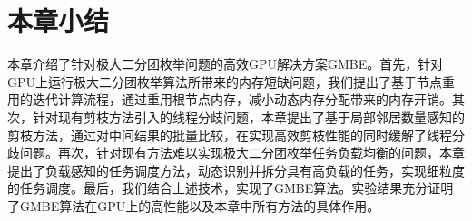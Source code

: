 \section{本章小结}

本章介绍了针对极大二分团枚举问题的高效GPU解决方案GMBE。首先，针对GPU上运行极大二分团枚举算法所带来的内存短缺问题，我们提出了基于节点重用的迭代计算流程，通过重用根节点内存，减小动态内存分配带来的内存开销。其次，针对现有剪枝方法引入的线程分歧问题，本章提出了基于局部邻居数量感知的剪枝方法，通过对中间结果的批量比较，在实现高效剪枝性能的同时缓解了线程分歧问题。再次，针对现有方法难以实现极大二分团枚举任务负载均衡的问题，本章提出了负载感知的任务调度方法，动态识别并拆分具有高负载的任务，实现细粒度的任务调度。最后，我们结合上述技术，实现了GMBE算法。实验结果充分证明了GMBE算法在GPU上的高性能以及本章中所有方法的具体作用。